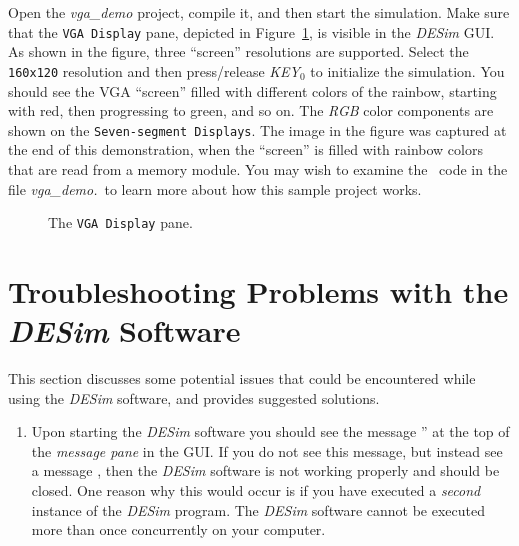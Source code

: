 {Open the {\it vga\_demo} project, compile it, and then start the simulation. Make sure
that the \texttt{VGA Display} pane, depicted in Figure~\ref{fig:vga_pane}, is visible in
the {\it DESim} GUI. As shown in the figure, three ``screen'' resolutions are supported. 
Select the \texttt{160x120} resolution and then press/release {\it KEY}$_0$ to initialize 
the simulation. You should see the VGA ``screen'' filled with different colors of the
rainbow, starting with red, then progressing to green, and so on. The {\it RGB} color components
are shown  on the \texttt{Seven-segment Displays}. The image in the figure was
captured at the end of this demonstration, when the 
``screen'' is filled with rainbow colors that are read from a memory 
module. You may wish to examine the 
\hdlName~code in the file {\it vga\_demo.\hdlFileExt}~to learn more about how this sample
project works.

\begin{figure}[h]
	\begin{center}
        \setlength{\fboxsep}{0pt}
	\end{center}
          \caption{The \texttt{VGA Display} pane.}
	\label{fig:vga_pane}
\end{figure}

\clearpage
\newpage
\section{Troubleshooting Problems with the {\it DESim} Software}
\label{sec:trouble}

This section discusses some potential issues that could be encountered while using the
{\it DESim} software, and provides suggested solutions.

\begin{enumerate}
\item Upon starting the {\it DESim} software you should see the message 
'' at the top of the {\it message pane} in the GUI. If you do 
not see this message, but instead see a message , then 
the {\it DESim} software is not working properly and should be closed. One
reason why this would occur is if you have executed a {\it second}
instance of the {\it DESim} program. The {\it DESim} software cannot be
executed more than once concurrently on your computer. 


\end{enumerate}}
